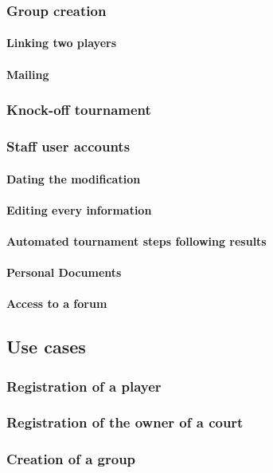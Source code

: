 \subsubsection{Group creation}

\paragraph{Linking two players}
\paragraph{Mailing}

\subsubsection{Knock-off tournament}
\subsubsection{Staff user accounts}

\paragraph{Dating the modification}
\paragraph{Editing every information}
\paragraph{Automated tournament steps following results}
\paragraph{Personal Documents}
\paragraph{Access to a forum}

\subsection{Use cases}
\subsubsection{Registration of a player}
\subsubsection{Registration of the owner of a court}
\subsubsection{Creation of a group}
